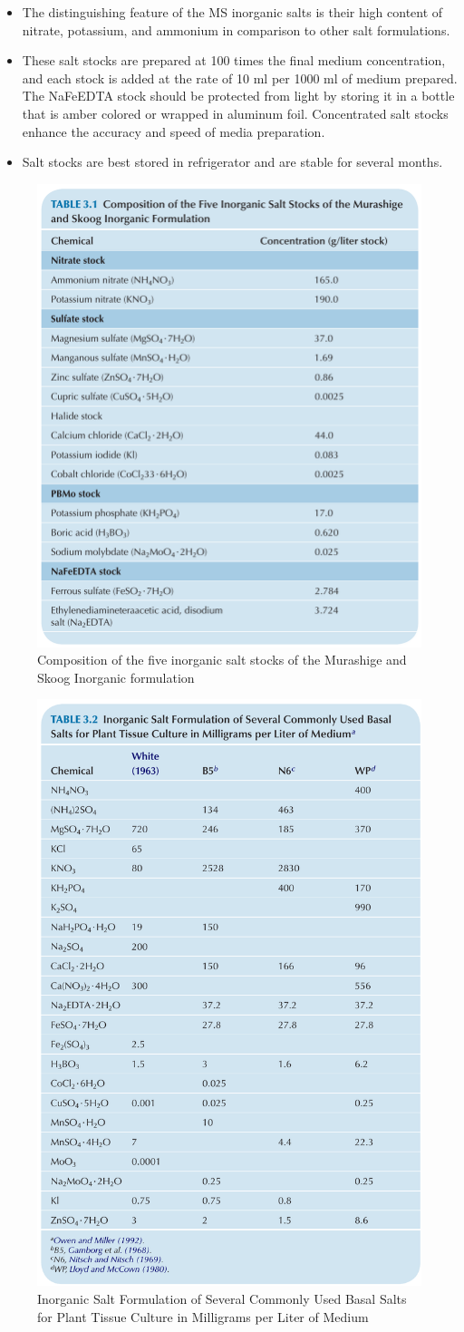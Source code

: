 \documentclass[
  ignorenonframetext,
  aspectratio=169]{beamer}
\providecommand{\tightlist}{%
  \setlength{\itemsep}{0pt}\setlength{\parskip}{0pt}}
\begin{document}
\begin{frame}{}
\protect\hypertarget{section-2}{}
\begin{itemize}
\tightlist
\item
  The distinguishing feature of the MS inorganic salts is their high
  content of nitrate, potassium, and ammonium in comparison to other
  salt formulations.
\item
  These salt stocks are prepared at 100 times the final medium
  concentration, and each stock is added at the rate of 10 ml per 1000
  ml of medium prepared. The NaFeEDTA stock should be protected from
  light by storing it in a bottle that is amber colored or wrapped in
  aluminum foil. Concentrated salt stocks enhance the accuracy and speed
  of media preparation.
\item
  Salt stocks are best stored in refrigerator and are stable for several
  months.
\end{itemize}
\end{frame}

\begin{frame}{}
\protect\hypertarget{section-3}{}
\begin{figure}
\includegraphics[width=0.38\linewidth]{../images/inorganic_salt_ms} \caption{Composition of the five inorganic salt stocks of the Murashige and Skoog Inorganic formulation}\label{fig:inorganic-salts}
\end{figure}
\end{frame}

\begin{frame}{}
\protect\hypertarget{section-4}{}
\begin{figure}
\includegraphics[width=0.35\linewidth]{../images/is_formulation_mediums} \caption{Inorganic Salt Formulation of Several Commonly Used Basal Salts for Plant Tissue Culture in Milligrams per Liter of Medium}\label{fig:is-formulation}
\end{figure}
\end{frame}
\end{document}
